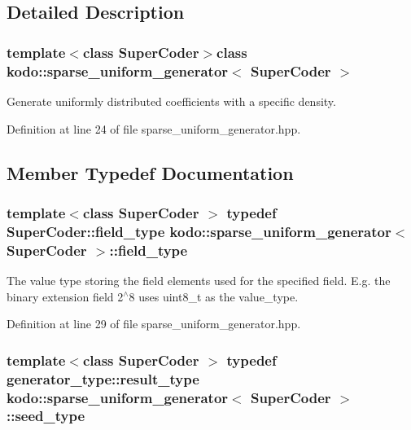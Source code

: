 \subsection{Detailed Description}
\subsubsection*{template$<$class Super\-Coder$>$class kodo\-::sparse\-\_\-uniform\-\_\-generator$<$ Super\-Coder $>$}

Generate uniformly distributed coefficients with a specific density. 

Definition at line 24 of file sparse\-\_\-uniform\-\_\-generator.\-hpp.



\subsection{Member Typedef Documentation}
\hypertarget{classkodo_1_1sparse__uniform__generator_ae0ec16f8835489e578077281b84d861b}{
\subsubsection[{field\-\_\-type}]{\setlength{\rightskip}{0pt plus 5cm}template$<$class Super\-Coder $>$ typedef Super\-Coder\-::field\-\_\-type {\bf kodo\-::sparse\-\_\-uniform\-\_\-generator}$<$ Super\-Coder $>$\-::{\bf field\-\_\-type}}}\label{classkodo_1_1sparse__uniform__generator_ae0ec16f8835489e578077281b84d861b}




The value type storing the field elements used for the specified field. E.\-g. the binary extension field 2$^\wedge$8 uses uint8\-\_\-t as the value\-\_\-type. 

Definition at line 29 of file sparse\-\_\-uniform\-\_\-generator.\-hpp.

\hypertarget{classkodo_1_1sparse__uniform__generator_aeb3e18efa56b33dcf69160029df5fff9}{
\subsubsection[{seed\-\_\-type}]{\setlength{\rightskip}{0pt plus 5cm}template$<$class Super\-Coder $>$ typedef generator\-\_\-type\-::result\-\_\-type {\bf kodo\-::sparse\-\_\-uniform\-\_\-generator}$<$ Super\-Coder $>$\-::{\bf seed\-\_\-type}}}\label{classkodo_1_1sparse__uniform__generator_aeb3e18efa56b33dcf69160029df5fff9}




